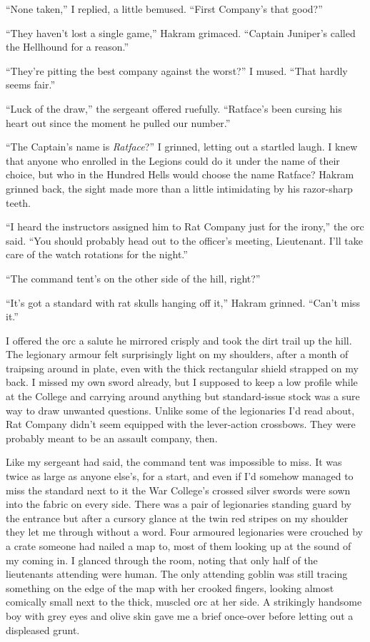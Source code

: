 \documentclass[12pt, openany]{book}
\begin{document}
“None taken,” I replied, a little bemused. “First Company’s that good?”

“They haven’t lost a single game,” Hakram grimaced. “Captain Juniper’s called the Hellhound for a reason.”

“They’re pitting the best company against the worst?” I mused. “That hardly seems fair.”

“Luck of the draw,” the sergeant offered ruefully. “Ratface’s been cursing his heart out since the moment he pulled our number.”

“The Captain’s name is \textit{Ratface}?” I grinned, letting out a startled laugh. I knew that anyone who enrolled in the Legions could do it under the name of their choice, but who in the Hundred Hells would choose the name Ratface? Hakram grinned back, the sight made more than a little intimidating by his razor-sharp teeth.

“I heard the instructors assigned him to Rat Company just for the irony,” the orc said. “You should probably head out to the officer’s meeting, Lieutenant. I’ll take care of the watch rotations for the night.”

“The command tent’s on the other side of the hill, right?”

“It’s got a standard with rat skulls hanging off it,” Hakram grinned. “Can’t miss it.”

I offered the orc a salute he mirrored crisply and took the dirt trail up the hill. The legionary armour felt surprisingly light on my shoulders, after a month of traipsing around in plate, even with the thick rectangular shield strapped on my back. I missed my own sword already, but I supposed to keep a low profile while at the College and carrying around anything but standard-issue stock was a sure way to draw unwanted questions. Unlike some of the legionaries I’d read about, Rat Company didn’t seem equipped with the lever-action crossbows. They were probably meant to be an assault company, then. 

Like my sergeant had said, the command tent was impossible to miss. It was twice as large as anyone else’s, for a start, and even if I’d somehow managed to miss the standard next to it the War College’s crossed silver swords were sown into the fabric on every side. There was a pair of legionaries standing guard by the entrance but after a cursory glance at the twin red stripes on my shoulder they let me through without a word. Four armoured legionaries were crouched by a crate someone had nailed a map to, most of them looking up at the sound of my coming in. I glanced through the room, noting that only half of the lieutenants attending were human. The only attending goblin was still tracing something on the edge of the map with her crooked fingers, looking almost comically small next to the thick, muscled orc at her side. A strikingly handsome boy with grey eyes and olive skin gave me a brief once-over before letting out a displeased grunt.
\end{document}
